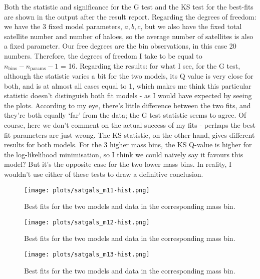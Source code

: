 \documentclass{article}
\begin{document}
Both the statistic and significance for the G test and the KS test for the best-fits are shown in the output after the result report. Regarding the degrees of freedom: we have the 3 fixed model parameters, $a, b, c$, but we also have the fixed total satellite number and number of haloes, so the average number of satellites is also a fixed parameter. Our free degrees are the bin observations, in this case 20 numbers. Therefore, the degrees of freedom I take to be equal to $n_\mathrm{bins} - n_{\mathrm{params}} - 1$ = 16. Regarding the results: for what I see, for the G test, although the statistic varies a bit for the two models, its Q value is very close for both, and is at almost all cases equal to 1, which makes me think this particular statistic doesn't distinguish both fit models - as I would have expected by seeing the plots. According to my eye, there's little difference between the two fits, and they're both equally `far' from the data; the G test statistic seems to agree. Of course, here we don't comment on the actual success of my fits - perhaps the best fit parameters are just wrong. The KS statistic, on the other hand, gives different results for both models. For the 3 higher mass bins, the KS Q-value is higher for the log-likelihood minimisation, so I think we could naively say it favours this model? But it's the opposite case for the two lower mass bins. In reality, I wouldn't use either of these tests to draw a definitive conclusion.







\begin{figure}[!ht]
    \centering
    \texttt{[image: plots/satgals\_m11-hist.png]}
    \caption{Best fits for the two models and data in the corresponding mass bin.}
    \label{fig:my_label}
\end{figure}

\begin{figure}[!hb]
    \centering
    \texttt{[image: plots/satgals\_m12-hist.png]}
    \caption{Best fits for the two models and data in the corresponding mass bin.}
    \label{fig:my_label}
\end{figure}

\begin{figure}[!ht]
    \centering
    \texttt{[image: plots/satgals\_m13-hist.png]}
    \caption{Best fits for the two models and data in the corresponding mass bin.}
    \label{fig:my_label}
\end{figure}
\end{document}
